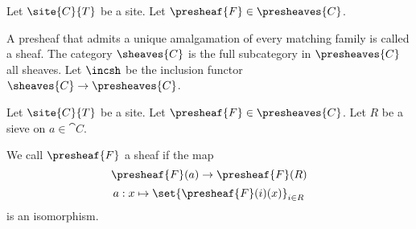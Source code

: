 \begin{definition}[Sheaves]
Let $\site{C}{T}$ be a site. 
Let $\presheaf{F} \in \presheaves{C}$.

A presheaf that admits a unique amalgamation of every matching family is called a sheaf.
The category $\sheaves{C}$ is the full subcategory in $\presheaves{C}$  all sheaves. 
Let $\incsh$ be the inclusion functor $\sheaves{C}\rightarrow \presheaves{C}$.
\end{definition}

\begin{definition}[Sheaves \#2]
Let $\site{C}{T}$ be a site. 
Let $\presheaf{F} \in \presheaves{C}$.
Let $R$ be a sieve on $a \in \cat{C}$.

We call $\presheaf{F}$ a sheaf if the map 
\[\presheaf{F}(a) \rightarrow \presheaf{F}(R)\] 
\[ a: x \mapsto \set{ \presheaf{F}(i)(x) }_{i \in R} \]
is an isomorphism.
\end{definition}
